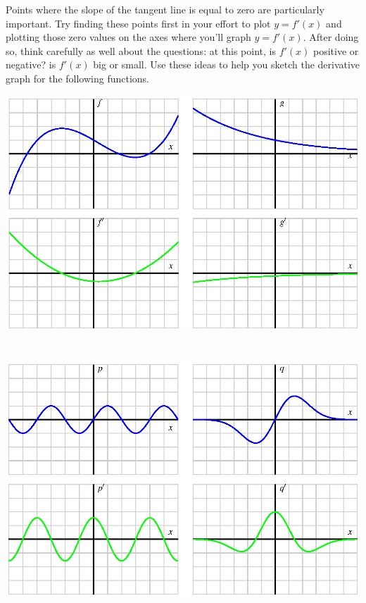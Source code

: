 \begin{bighint}
Points where the slope of the tangent line is equal to zero are particularly important.  Try finding these points first in your effort to plot $y = f'(x)$ and plotting those zero values on the axes where you'll graph $y = f'(x)$.  After doing so, think carefully as well about the questions: at this point, is $f'(x)$ positive or negative?  is $f'(x)$ big or small.  Use these ideas to help you sketch the derivative graph for the following functions.
\end{bighint}
\begin{activitySolution}
\begin{center}
\includegraphics{figures/1_4_Act1aSoln.eps} \\
\underline{\hspace{4in}}\\
\ \\
\includegraphics{figures/1_4_Act1bSoln.eps}
\end{center}


\end{activitySolution}
